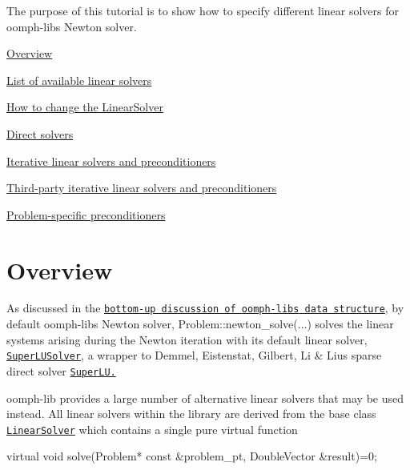 The purpose of this tutorial is to show how to specify different linear solvers for {\ttfamily oomph-\/lib\textquotesingle{}s} Newton solver.


\begin{DoxyItemize}
\item \hyperlink{index_overview}{Overview}
\item \hyperlink{index_available_solvers}{List of available linear solvers}
\item \hyperlink{index_how_to_change_linear_solver}{How to change the Linear\+Solver}
\begin{DoxyItemize}
\item \hyperlink{index_direct}{Direct solvers}
\item \hyperlink{index_iterative_linear_solvers}{Iterative linear solvers and preconditioners}
\item \hyperlink{index_third_party_iterative_linear_solvers}{Third-\/party iterative linear solvers and preconditioners}
\end{DoxyItemize}
\item \hyperlink{index_specific_precond}{Problem-\/specific preconditioners}
\end{DoxyItemize}

 

\hypertarget{index_overview}{}\section{Overview}\label{index_overview}
As discussed in the \href{../../the_data_structure/html/index.html}{\tt bottom-\/up discussion of {\ttfamily oomph-\/lib\textquotesingle{}s} data structure}, by default {\ttfamily oomph-\/lib\textquotesingle{}s} Newton solver, {\ttfamily Problem\+::newton\+\_\+solve}(...) solves the linear systems arising during the Newton iteration with its default linear solver, \href{../../the_data_structure/html/classoomph_1_1SuperLUSolver.html}{\tt {\ttfamily  Super\+L\+U\+Solver}}, a wrapper to Demmel, Eistenstat, Gilbert, Li \& Liu\textquotesingle{}s sparse direct solver \href{http://crd.lbl.gov/~xiaoye/SuperLU}{\tt Super\+LU.}

{\ttfamily oomph-\/lib} provides a large number of alternative linear solvers that may be used instead. All linear solvers within the library are derived from the base class \href{../../the_data_structure/html/classoomph_1_1LinearSolver.html}{\tt {\ttfamily  Linear\+Solver}} which contains a single pure virtual function

 
\begin{DoxyCodeInclude}
 \textcolor{keyword}{virtual} \textcolor{keywordtype}{void} solve(Problem* \textcolor{keyword}{const} &problem\_pt, DoubleVector &result)=0;

\end{DoxyCodeInclude}


